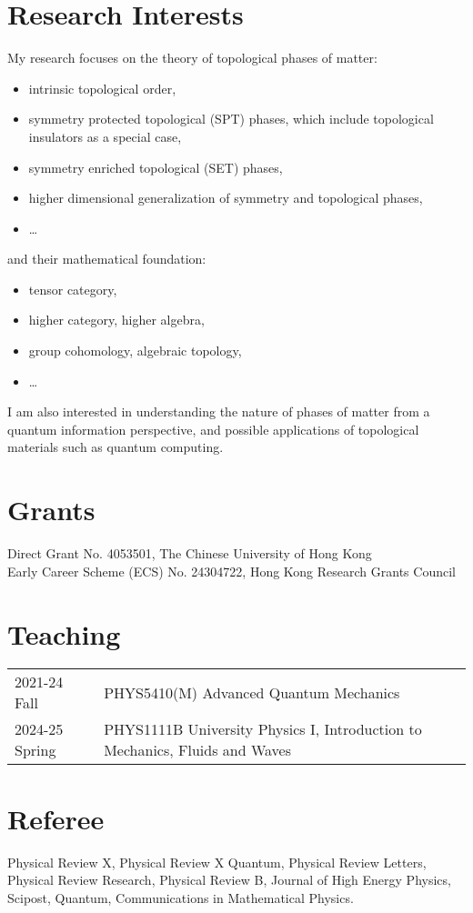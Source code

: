 \documentclass[hidelinks,a4paper]{article}
\begin{document}
\section*{Research Interests}
My research focuses on the theory of topological phases of matter:
\begin{itemize}
  \item  intrinsic topological order,
  \item  symmetry protected topological (SPT) phases, which include topological
    insulators as a special case,
  \item  symmetry enriched topological (SET) phases,
  \item  higher dimensional generalization of symmetry and topological phases,
  \item \ldots
\end{itemize}
and their mathematical foundation:
\begin{itemize}
  \item tensor category,
  \item higher category, higher algebra,
  \item group cohomology, algebraic topology,
  \item \ldots
\end{itemize}
I am also interested in understanding the nature of phases of matter from a
quantum information perspective, and possible applications of topological
materials such as quantum computing.

\section*{Grants}
Direct Grant No. 4053501, The Chinese University of Hong Kong\\
Early Career Scheme (ECS) No. 24304722, Hong Kong Research Grants Council

\section*{Teaching}
\begin{tabular}{ll}
  2021-24 Fall & PHYS5410(M) Advanced Quantum Mechanics\\
  2024-25 Spring& PHYS1111B University Physics I, Introduction to Mechanics, Fluids and Waves
\end{tabular}



\section*{Referee}
Physical Review X, Physical Review X Quantum, Physical Review Letters, Physical
Review Research, Physical Review B, Journal of High Energy Physics, Scipost, Quantum, Communications in Mathematical Physics.
\end{document}
